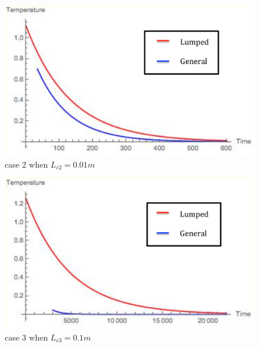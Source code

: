 \begin{solution}
\begin{figure}[H]
  \centering
    \includegraphics[scale=0.5]{figures/ch4/3}
    \caption{case 2 when $L_{c2}=0.01 m$}
    \label{fig:4:3}
\end{figure}

\begin{figure}[H]
  \centering
    \includegraphics[scale=0.5]{figures/ch4/4}
    \caption{case 3 when $L_{c3}=0.1 m$}
    \label{fig:4:4}
\end{figure}
\end{solution}

